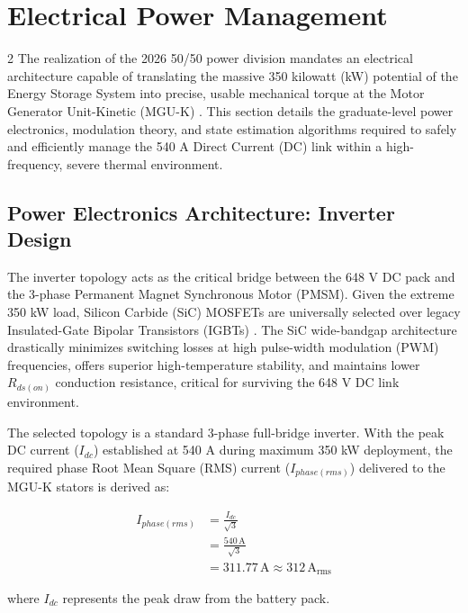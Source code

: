 \section{Electrical Power Management}

\begin{multicols}{2}
The realization of the 2026 50/50 power division mandates an electrical architecture capable of translating the massive 350 kilowatt (kW) potential of the Energy Storage System into precise, usable mechanical torque at the Motor Generator Unit-Kinetic (MGU-K) \cite{FIA_2026_PU_Regulations}. This section details the graduate-level power electronics, modulation theory, and state estimation algorithms required to safely and efficiently manage the 540 A Direct Current (DC) link within a high-frequency, severe thermal environment.

\subsection{Power Electronics Architecture: Inverter Design}

The inverter topology acts as the critical bridge between the 648 V DC pack and the 3-phase Permanent Magnet Synchronous Motor (PMSM). Given the extreme 350 kW load, Silicon Carbide (SiC) MOSFETs are universally selected over legacy Insulated-Gate Bipolar Transistors (IGBTs) \cite{sic_power_lit}. The SiC wide-bandgap architecture drastically minimizes switching losses at high pulse-width modulation (PWM) frequencies, offers superior high-temperature stability, and maintains lower $R_{ds(on)}$ conduction resistance, critical for surviving the 648 V DC link environment.

The selected topology is a standard 3-phase full-bridge inverter. With the peak DC current ($I_{dc}$) established at 540 A during maximum 350 kW deployment, the required phase Root Mean Square (RMS) current ($I_{phase(rms)}$) delivered to the MGU-K stators is derived as:

\begin{equation} \label{eq:phase_rms}
\begin{split}
I_{phase(rms)} &= \frac{I_{dc}}{\sqrt{3}} \\
&= \frac{540\,\mathrm{A}}{\sqrt{3}} \\
&= 311.77\,\mathrm{A} \approx 312\,\mathrm{A_{rms}}
\end{split}
\end{equation}

where $I_{dc}$ represents the peak draw from the battery pack.


\end{multicols}
